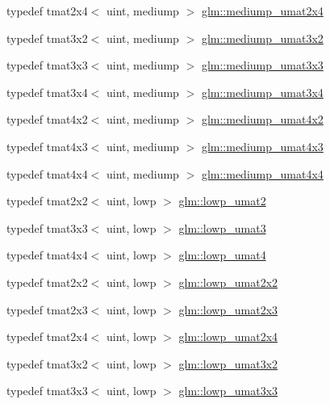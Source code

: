 \begin{DoxyCompactItemize}
typedef tmat2x4$<$ uint, mediump $>$ \hyperlink{group__gtc__matrix__integer_ga972445669c6e6652716f3f0b664b94cd}{glm\-::mediump\-\_\-umat2x4}
\item 
typedef tmat3x2$<$ uint, mediump $>$ \hyperlink{group__gtc__matrix__integer_ga62243caa5b85b1cf91021ce6ffc21183}{glm\-::mediump\-\_\-umat3x2}
\item 
typedef tmat3x3$<$ uint, mediump $>$ \hyperlink{group__gtc__matrix__integer_gaa55f7815a399a780907a1dcd4caef7d9}{glm\-::mediump\-\_\-umat3x3}
\item 
typedef tmat3x4$<$ uint, mediump $>$ \hyperlink{group__gtc__matrix__integer_ga21a2361cc10822ad1a2297ac286c8e26}{glm\-::mediump\-\_\-umat3x4}
\item 
typedef tmat4x2$<$ uint, mediump $>$ \hyperlink{group__gtc__matrix__integer_ga9dd5ce011ca43d90cf1b94084c7e90ac}{glm\-::mediump\-\_\-umat4x2}
\item 
typedef tmat4x3$<$ uint, mediump $>$ \hyperlink{group__gtc__matrix__integer_gac91ed5aa76fe160d5ab5d31e2b94d95b}{glm\-::mediump\-\_\-umat4x3}
\item 
typedef tmat4x4$<$ uint, mediump $>$ \hyperlink{group__gtc__matrix__integer_ga7141a9d9f1c26521e397be34d19c1b8f}{glm\-::mediump\-\_\-umat4x4}
\item 
typedef tmat2x2$<$ uint, lowp $>$ \hyperlink{group__gtc__matrix__integer_ga0ff71fefa5bfab1462195c3de4f83f67}{glm\-::lowp\-\_\-umat2}
\item 
typedef tmat3x3$<$ uint, lowp $>$ \hyperlink{group__gtc__matrix__integer_ga71b66cc4f5e2d30b64ec99425562a6b6}{glm\-::lowp\-\_\-umat3}
\item 
typedef tmat4x4$<$ uint, lowp $>$ \hyperlink{group__gtc__matrix__integer_gaa430d894a3290d551061d0d77c017cec}{glm\-::lowp\-\_\-umat4}
\item 
typedef tmat2x2$<$ uint, lowp $>$ \hyperlink{group__gtc__matrix__integer_ga13b2812e9b0af47e0f498391383d145a}{glm\-::lowp\-\_\-umat2x2}
\item 
typedef tmat2x3$<$ uint, lowp $>$ \hyperlink{group__gtc__matrix__integer_ga3af254ecb450000314422b1730afacc0}{glm\-::lowp\-\_\-umat2x3}
\item 
typedef tmat2x4$<$ uint, lowp $>$ \hyperlink{group__gtc__matrix__integer_gad5e8f08c103d5dd33767e31938357aa6}{glm\-::lowp\-\_\-umat2x4}
\item 
typedef tmat3x2$<$ uint, lowp $>$ \hyperlink{group__gtc__matrix__integer_ga3ea8482ddaa10befe8dc2d681d86bb59}{glm\-::lowp\-\_\-umat3x2}
\item 
typedef tmat3x3$<$ uint, lowp $>$ \hyperlink{group__gtc__matrix__integer_gab27a50de8b11ec09b2f5cf1cf4c1a062}{glm\-::lowp\-\_\-umat3x3}

\end{DoxyCompactItemize}
